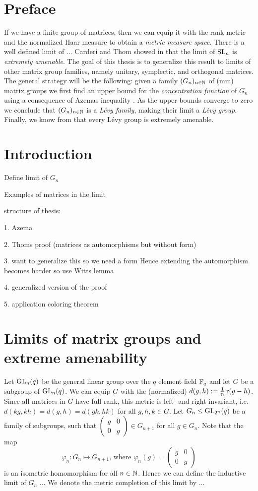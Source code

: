 \section*{Preface}
If we have a finite group of matrices, then we can equip it with the rank metric and the normalized Haar measure to obtain a \emph{metric measure space}.
There is a well defined limit of ...
Carderi and Thom  showed in \cite{thom} that the limit of $\operatorname{SL}_n$ is \emph{extremely amenable}. The goal of this thesis is to generalize this result to limits of other matrix group families, namely unitary, symplectic, and orthogonal matrices. The general strategy will be the following: given a family $(G_n)_{n\in\mathbb{N}}$ of (mm) matrix groups we first find an upper bound for the \emph{concentration function} of $G_n$ using a consequence of Azemas inequality \cite{Azema book}. As the upper bounds converge to zero we conclude that $(G_n)_{n\in\mathbb{N}}$ is a \emph{L\'{e}vy family}, making their limit a \emph{L\'{e}vy group}. Finally, we know from \cite{29} that every L\'{e}vy group is extremely amenable.

\section{Introduction}

Define limit of $G_n$

Examples of matrices in the limit

structure of thesis:

1. Azema

2. Thoms proof (matrices as automorphisms but without form)

3. want to generalize this so we need a form Hence extending the automorphism becomes harder so use Witts lemma

4. generalized version of the proof

5. application coloring theorem


\section{Limits of matrix groups and extreme amenability}
Let $\operatorname{GL}_n(q)$ be the general linear group over the $q$ element field $\mathbb{F}_q$ and let $G$ be a subgroup of $\operatorname{GL}_n(q)$. We can equip $G$ with the (normalized)  $d(g,h):=\frac{1}{n}\operatorname{r}(g-h)$. Since all matrices in $G$ have full rank, this metric is left- and right-invariant, i.e. $d(kg,kh)=d(g,h)=d(gk,hk)$ for all $g,h,k\in G$. Let $G_n\leq \operatorname{GL}_{2^n}(q)$ be a family of subgroups, such that 
$\begin{pmatrix}
g &0\\
0&g
\end{pmatrix}\in G_{n+1}$ for all $g\in G_n$. Note that the map
\[\varphi_n\colon G_n\mapsto G_{n+1}\text{, where }\varphi_n(g)=\begin{pmatrix}
g &0\\
0&g
\end{pmatrix}\]
is an isometric homomorphism for all $n\in\mathbb{N}$. Hence we can define the inductive limit of $G_n$ ... We denote the metric completion of this limit by ...


